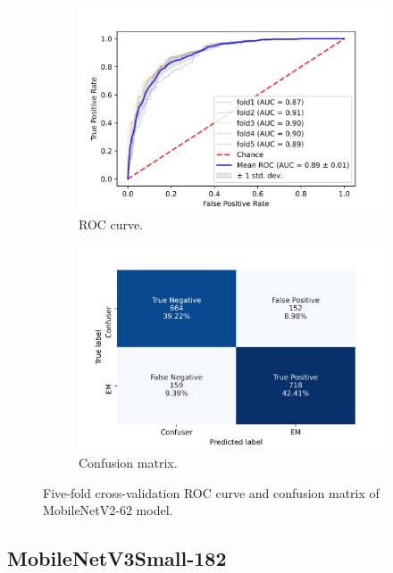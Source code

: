 \begin{figure}[h!]
	\centering
	\begin{subfigure}[b]{0.49\textwidth}
		\centering
		\includegraphics[width=\textwidth,keepaspectratio]{images/Supplement4/image143.png}
		\caption{ROC curve.}
	\end{subfigure}
	\hfill
	\begin{subfigure}[b]{0.49\textwidth}
		\centering
		\includegraphics[width=\textwidth,keepaspectratio]{images/Supplement4/image149.png}
		\caption{Confusion matrix.}
	\end{subfigure}
	\caption{Five-fold cross-validation ROC curve and confusion matrix of MobileNetV2-62 model.}
\end{figure}

\vfill\clearpage
\subsection{MobileNetV3Small-182}

